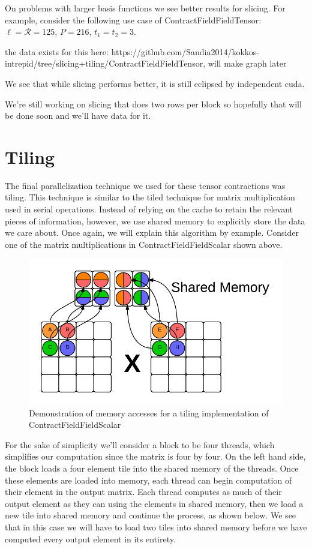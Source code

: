 On problems with larger basis functions we see better results for slicing. For example, consider the following use case of ContractFieldFieldTensor: $\ell = \mathcal{R} = 125$, $P = 216$, $t_1 = t_2 = 3$.

\vspace{10mm}
the data exists for this here: https://github.com/Sandia2014/kokkos-intrepid/tree/slicing+tiling/ContractFieldFieldTensor, will make graph later


We see that while slicing performs better, it is still eclipsed by independent cuda. 

We're still working on slicing that does two rows per block so hopefully that will be done soon and we'll have data for it. 

\section{Tiling}

The final parallelization technique we used for these tensor contractions was tiling. This technique is similar to the tiled technique for matrix multiplication used in serial operations. Instead of relying on the cache to retain the relevant pieces of information, however, we use shared memory to explicitly store the data we care about. Once again, we will explain this algorithm by example. Consider one of the matrix multiplications in ContractFieldFieldScalar shown above. 

\begin{figure}
    \centering
    \includegraphics[scale = .7]{ContractFieldFieldScalarGraphicTiling}
    \caption{Demonstration of memory accesses for a tiling implementation of ContractFieldFieldScalar}
\end{figure}

For the sake of simplicity we'll consider a block to be four threads, which simplifies our computation since the matrix is four by four. On the left hand side, the block loads a four element tile into the shared memory of the threads. Once these elements are loaded into memory, each thread can begin computation of their element in the output matrix. Each thread computes as much of their output element as they can using the elements in shared memory, then we load a new tile into shared memory and continue the process, as shown below. We see that in this case we will have to load two tiles into shared memory before we have computed every output element in its entirety. 

